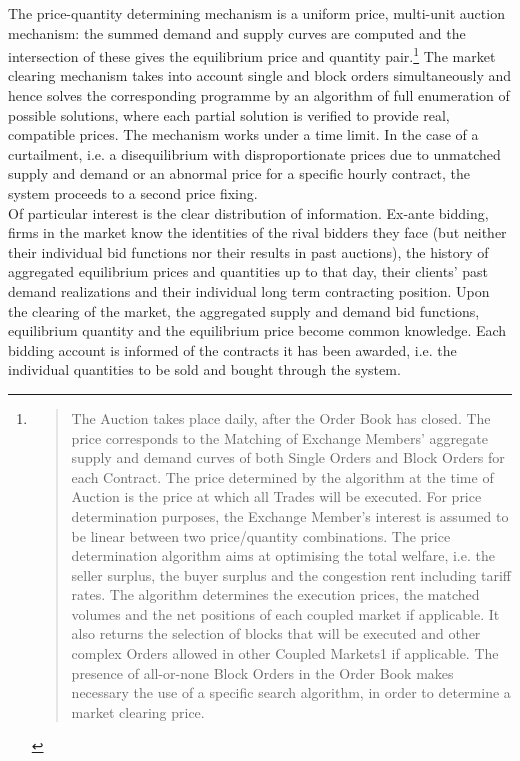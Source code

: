 The price-quantity determining mechanism is a uniform price, multi-unit auction mechanism: the summed demand and supply curves are computed and the intersection of these gives the equilibrium price and quantity pair.\footnote{\begin{quote}The Auction takes place daily, after the Order Book has closed. The price corresponds to the Matching of Exchange Members' aggregate supply and demand curves of both Single Orders and Block Orders for each Contract. The price determined by the algorithm at the time of Auction is the price at which all Trades will be executed. For price determination purposes, the Exchange Member's interest is assumed to be linear between two price/quantity combinations. The price determination algorithm aims at optimising the total welfare, i.e. the seller surplus, the buyer surplus and the congestion rent including tariff rates. The algorithm determines the execution prices, the matched volumes and the net positions of each coupled market if applicable. It also returns the selection of blocks that will be executed and other complex Orders allowed in other Coupled Markets1 if applicable. The presence of all-or-none Block Orders in the Order Book makes necessary the use of a specific search algorithm, in order to determine a market clearing price.\end{quote} \cite{EPEXRules}} The market clearing mechanism takes into account single and block orders simultaneously and hence solves the corresponding programme by an algorithm of full enumeration of possible solutions, where each partial solution is verified to provide real, compatible prices. %
The mechanism works under a time limit. In the case of a curtailment, i.e. a disequilibrium with disproportionate prices due to unmatched supply and demand or an abnormal price for a specific hourly contract, the system proceeds to a second price fixing. \\

Of particular interest is the clear distribution of information. Ex-ante bidding, firms in the market know the identities of the rival bidders they face (but neither their individual bid functions nor their results in past auctions), the history of aggregated equilibrium prices and quantities up to that day, their clients' past demand realizations and their individual long term contracting position. Upon the clearing of the market, the aggregated supply and demand bid functions, equilibrium quantity and the equilibrium price become common knowledge. Each bidding account is informed of the contracts it has been awarded, i.e. the individual quantities to be sold and bought through the system.



